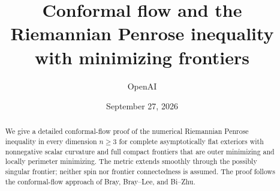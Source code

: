 \documentclass[11pt]{article}
\title{Conformal flow and the Riemannian Penrose inequality with minimizing frontiers}
\author{OpenAI}
\date{September 27, 2026}
\begin{document}
\maketitle
\begin{abstract}
We give a detailed conformal-flow proof of the numerical Riemannian
Penrose inequality in every dimension $n\ge3$ for complete
asymptotically flat exteriors with nonnegative scalar curvature and
full compact frontiers that are outer minimizing and locally perimeter
minimizing. The metric extends smoothly through the possibly singular
frontier; neither spin nor frontier connectedness is assumed.
The proof follows the conformal-flow approach of Bray, Bray--Lee,
and Bi--Zhu.
\end{abstract}
\tableofcontents











\appendix


\par
{}
{}

\end{document}
